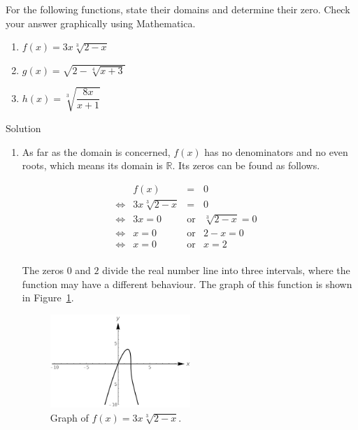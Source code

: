 \ifmathematica
\begin{example}  For the following functions, state their domains and determine their zero.  Check your answer graphically using Mathematica.

\begin{multicols}{2}
\begin{enumerate}

\item  $f(x) = 3x \sqrt[3]{2-x}$

\ifanalysis \item  $g(x) = \sqrt{2-\sqrt[4]{x+3}}$\fi


\ifvc\item  $h(x) = \sqrt[3]{\dfrac{8x}{x+1}}$\fi

\end{enumerate}
\end{multicols}

Solution 



\begin{enumerate}

\item  As far as the domain is concerned, $f(x)$ has no denominators and no even roots, which means its domain is $\mathbb{R}$.  Its zeros can be found as follows.

\[ \begin{array}{rrclr}

&f(x) & = & 0 & \\

\Leftrightarrow&3x \sqrt[3]{2-x} & = & 0 \\

\Leftrightarrow&3x = 0 & \mbox{or} & \sqrt[3]{2-x} = 0 & \\

\Leftrightarrow&x = 0 & \mbox{or} & 2-x = 0 & \\

\Leftrightarrow&x = 0 & \mbox{or} & x=2 & \\

\end{array}\]


The zeros $0$ and $2$ divide the real number line into three intervals, where the function may have a different behaviour. The graph of this function is shown in Figure~\ref{fig_algebraic_15}.
\begin{figure}[H]
    \begin{center}
			\includegraphics[width=0.5\textwidth]{fig_algebraic_15}
	\end{center}
    \caption{Graph of $f(x) = 3x \sqrt[3]{2-x}$.}
    \label{fig_algebraic_15}
\end{figure}
  

\end{enumerate}
\end{example}
